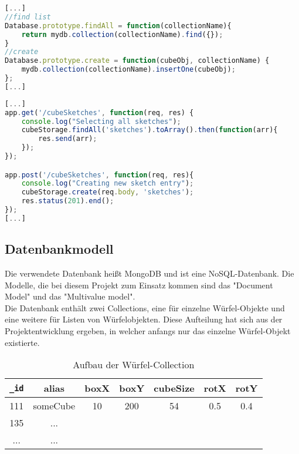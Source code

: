 \documentclass[12pt, ngerman, utf8]{article}
\begin{document}
\begin{lstlisting}[language=JavaScript, caption={CRUD-Operationen aus storage.js},label=storagejs]
[...]
//find list
Database.prototype.findAll = function(collectionName){
    return mydb.collection(collectionName).find({});
}
//create
Database.prototype.create = function(cubeObj, collectionName) {
    mydb.collection(collectionName).insertOne(cubeObj);
};
[...]
\end{lstlisting}

\begin{lstlisting}[language=JavaScript, caption={Request-Routing und Implementierung der REST-Methoden aus app.js},label=appjs]
[...]
app.get('/cubeSketches', function(req, res) {
    console.log("Selecting all sketches");
    cubeStorage.findAll('sketches').toArray().then(function(arr){
        res.send(arr);
    });
});

app.post('/cubeSketches', function(req, res){
    console.log("Creating new sketch entry");
    cubeStorage.create(req.body, 'sketches');
    res.status(201).end();
});
[...]
\end{lstlisting}

\subsection{Datenbankmodell}
Die verwendete Datenbank heißt MongoDB und ist eine NoSQL-Datenbank. Die Modelle, die bei diesem Projekt zum Einsatz kommen sind das "Document Model" und das "Multivalue model".\\
Die Datenbank enthält zwei Collections, eine für einzelne Würfel-Objekte und eine weitere für Listen von Würfelobjekten. Diese Aufteilung hat sich aus der Projektentwicklung ergeben, in welcher anfangs nur das einzelne Würfel-Objekt existierte.\\

\begin{table}[htb]
\begin{center}
 \begin{tabular}{|c|c|c|c|c|c|c|} 
 \hline
 \verb|_id| & alias & boxX & boxY & cubeSize & rotX & rotY \\ [0.5ex] 
 \hline\hline
 111 & someCube & 10 & 200 & 54 & 0.5 & 0.4 \\ 
 \hline
 135 & ... &  & & & &\\
 \hline
 ... & ... &  & & & &\\ [1ex] 
 \hline
\end{tabular}
\end{center}
 \caption{Aufbau der Würfel-Collection}
\end{table}
\end{document}
